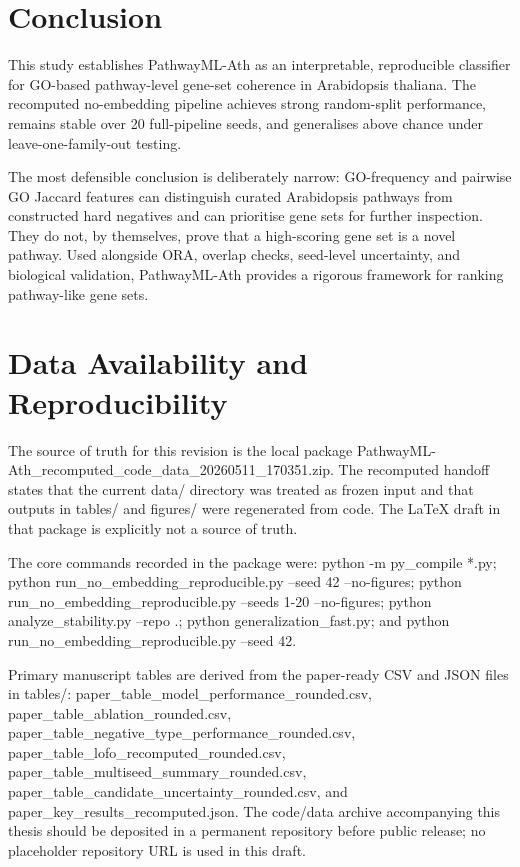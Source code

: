 \documentclass[11pt]{article}
\begin{document}
\section{Conclusion}
This study establishes PathwayML-Ath as an interpretable, reproducible classifier for GO-based pathway-level gene-set coherence in Arabidopsis thaliana. The recomputed no-embedding pipeline achieves strong random-split performance, remains stable over 20 full-pipeline seeds, and generalises above chance under leave-one-family-out testing.

The most defensible conclusion is deliberately narrow: GO-frequency and pairwise GO Jaccard features can distinguish curated Arabidopsis pathways from constructed hard negatives and can prioritise gene sets for further inspection. They do not, by themselves, prove that a high-scoring gene set is a novel pathway. Used alongside ORA, overlap checks, seed-level uncertainty, and biological validation, PathwayML-Ath provides a rigorous framework for ranking pathway-like gene sets.

\section{Data Availability and Reproducibility}
The source of truth for this revision is the local package PathwayML-Ath\_recomputed\_code\_data\_20260511\_170351.zip. The recomputed handoff states that the current data/ directory was treated as frozen input and that outputs in tables/ and figures/ were regenerated from code. The LaTeX draft in that package is explicitly not a source of truth.

The core commands recorded in the package were: python -m py\_compile *.py; python run\_no\_embedding\_reproducible.py --seed 42 --no-figures; python run\_no\_embedding\_reproducible.py --seeds 1-20 --no-figures; python analyze\_stability.py --repo .; python generalization\_fast.py; and python run\_no\_embedding\_reproducible.py --seed 42.

Primary manuscript tables are derived from the paper-ready CSV and JSON files in tables/: paper\_table\_model\_performance\_rounded.csv, paper\_table\_ablation\_rounded.csv, paper\_table\_negative\_type\_performance\_rounded.csv, paper\_table\_lofo\_recomputed\_rounded.csv, paper\_table\_multiseed\_summary\_rounded.csv, paper\_table\_candidate\_uncertainty\_rounded.csv, and paper\_key\_results\_recomputed.json. The code/data archive accompanying this thesis should be deposited in a permanent repository before public release; no placeholder repository URL is used in this draft.
\end{document}
